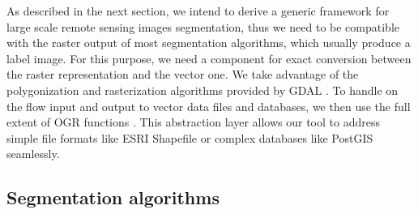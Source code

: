 \documentclass{josis}
\begin{document}
As described in the next section, we intend to derive a generic
framework for large scale remote sensing images segmentation, thus we
need to be compatible with the raster output of most segmentation
algorithms, which usually produce a label image. For this purpose, we
need a component for exact conversion between the raster
representation and the vector one. We take advantage of the
polygonization and rasterization algorithms provided by GDAL
\cite{}. To handle on the flow input and output to vector data files
and databases, we then use the full extent of OGR functions
\cite{}. This abstraction layer allows our tool to address
simple file formats like ESRI Shapefile or complex databases like
PostGIS seamlessly.

\subsection{Segmentation algorithms}
\end{document}
